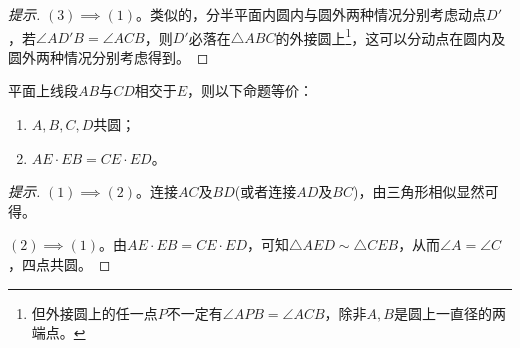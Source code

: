 \begin{proof}[提示]
  $(3)\implies(1)$。类似的，分半平面内圆内与圆外两种情况分别考虑动点$D'$，若$\angle AD'B=\angle ACB$，则$D'$必落在$\triangle ABC$的外接圆上\footnote{但外接圆上的任一点$P$不一定有$\angle APB=\angle ACB$，除非$A,B$是圆上一直径的两端点。}，这可以分动点在圆内及圆外两种情况分别考虑得到。
\end{proof}

\begin{theorem}[割线定理]
  平面上线段$AB$与$CD$相交于$E$，则以下命题等价：
  \begin{enumerate}
  \item $A,B,C,D$共圆；
  \item $AE\cdot EB=CE\cdot ED$。
  \end{enumerate}
\end{theorem}
\begin{proof}[提示]
  $(1)\implies(2)$。连接$AC$及$BD$(或者连接$AD$及$BC$)，由三角形相似显然可得。

  \begin{center}
  \end{center}

  $(2)\implies(1)$。由$AE\cdot EB=CE\cdot ED$，可知$\triangle AED\sim\triangle CEB$，从而$\angle A=\angle C$，四点共圆。
\end{proof}